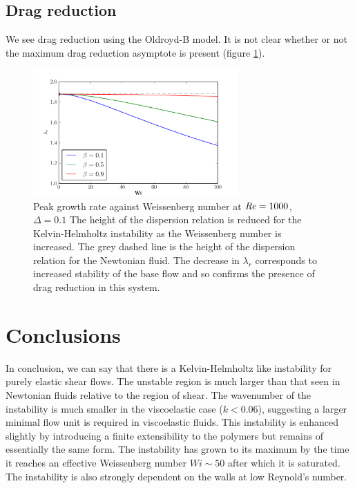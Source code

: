 \documentclass{jfm}
\newcommand\Rey{\mbox{\textit{Re}}}  %
\begin{document}
\subsection{Drag reduction}

We see drag reduction using the Oldroyd-B model. It is not clear whether or not
the maximum drag reduction asymptote is present (figure
\ref{fig:KH_drag_reduction}).

\begin{figure}
    \centering \includegraphics[width=0.7\textwidth]{KH_high_Re_vary_Wi}
    \caption{ 
	Peak growth rate against Weissenberg number at $\Rey = 1000$,
	$\Delta = 0.1$ The height of the dispersion relation is reduced for the
	Kelvin-Helmholtz instability as the Weissenberg number is increased.
	The grey dashed line is the height of the dispersion relation for the
	Newtonian fluid. The decrease in $\lambda_{r}$ corresponds to increased
	stability of the base flow and so confirms the presence of drag
	reduction in this system.  
    } 
    \label{fig:KH_drag_reduction} 
\end{figure}

\section{Conclusions}

In conclusion, we can say that there is a Kelvin-Helmholtz like instability for
purely elastic shear flows. The unstable region is much larger than that seen
in Newtonian fluids relative to the region of shear. The wavenumber of the
instability is much smaller in the viscoelastic case ($k<0.06$), suggesting a
larger minimal flow unit is required in viscoelastic fluids. This instability
is enhanced slightly by introducing a finite extensibility to the polymers but
remains of essentially the same form. The instability has grown to its maximum
by the time it reaches an effective Weissenberg number $ Wi \sim 50$ after
which it is saturated. The instability is also strongly dependent on the walls
at low Reynold's number.


%



\end{document}

